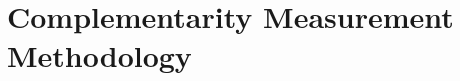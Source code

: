 
\chapter{Complementarity Measurement Methodology}
\label{app:method-comp}

\begin{abstract}
This appendix presents the key concepts and formalizations for Complementarity Measurement Methodology.
It provides theoretical foundations, practical applications, and integration
points with other components of the Evidence-Based Framework (EBF).
The content supports decision-making and behavioral analysis in the context
of complementarity and context-dependent outcomes.
\end{abstract}


